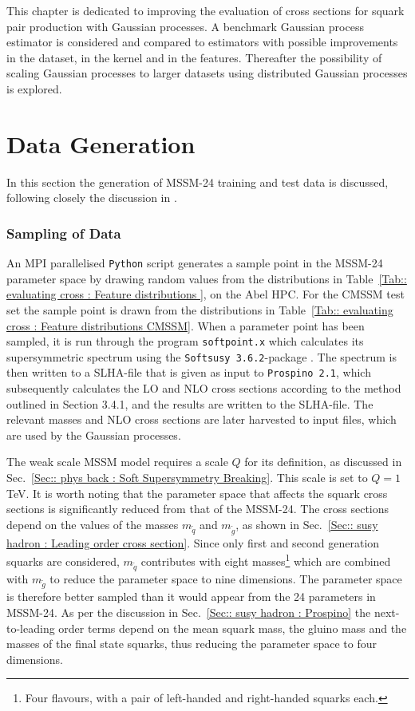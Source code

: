\documentclass[twoside,english]{uiofysmaster}
\begin{document}
{{This chapter is dedicated to improving the evaluation of cross sections for squark pair production with Gaussian processes. A benchmark Gaussian process estimator is considered and compared to estimators with possible improvements in the dataset, in the kernel and in the features. Thereafter the possibility of scaling Gaussian processes to larger datasets using distributed Gaussian processes is explored.

\section{Data Generation}

In this section the generation of MSSM-24 training and test data is discussed, following closely the discussion in \cite{sparre2018fast}. 

\subsubsection{Sampling of Data}

An MPI parallelised \verb|Python| script generates a sample point in the MSSM-24 parameter space by drawing random values from the distributions in Table~\ref{Tab:: evaluating cross : Feature distributions }, on the Abel HPC. For the CMSSM test set the sample point is drawn from the distributions in Table~\ref{Tab:: evaluating cross : Feature distributions CMSSM}. When a parameter point has been sampled, it is run through the program \verb|softpoint.x| which calculates its supersymmetric spectrum using the \verb|Softsusy 3.6.2|-package \cite{Allanach:2001kg}. The spectrum is then written to a SLHA-file \cite{Skands:2003cj} that is given as input to \verb|Prospino 2.1|, which subsequently calculates the LO and NLO cross sections according to the method outlined in Section 3.4.1, and the results are written to the SLHA-file. The relevant masses and NLO cross sections are later harvested to input files, which are used by the Gaussian processes. 

The weak scale MSSM model requires a scale $Q$ for its definition, as discussed in Sec.~\ref{Sec:: phys back : Soft Supersymmetry Breaking}. This scale is set to $Q=1$ TeV. It is worth noting that the parameter space that affects the squark cross sections is significantly reduced from that of the MSSM-24. The cross sections depend on the values of the masses $m_{\widetilde{q}}$ and $m_{\widetilde{g}}$, as shown in Sec.~\ref{Sec:: susy hadron : Leading order cross section}. Since only first and second generation squarks are considered, $m_{\widetilde{q}}$ contributes with eight masses\footnote{Four flavours, with a pair of left-handed and right-handed squarks each.} which are combined with $m_{\widetilde{g}}$ to reduce the parameter space to nine dimensions. The parameter space is therefore better sampled than it would appear from the 24 parameters in MSSM-24. As per the discussion in Sec.~\ref{Sec:: susy hadron : Prospino} the next-to-leading order terms depend on the mean squark mass, the gluino mass and the masses of the final state squarks, thus reducing the parameter space to four dimensions.

}}
\end{document}
